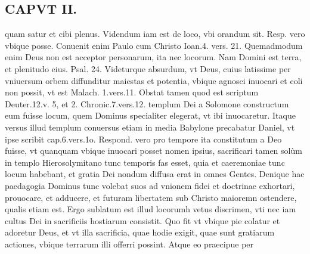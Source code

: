\documentclass{article}
\begin{document}
\begin{pages}
\section*{CAPVT II. }
\marginpar{[ p.67 ]}\pstart quam satur et cibi plenus.  \pend\pstart Videndum iam est de loco, vbi orandum sit. Resp. vero vbique posse. Conuenit enim Paulo cum Christo Ioan.4. vers. 21. Quemadmodum enim Deus non est acceptor personarum, ita nec locorum. Nam Domini est terra, et plenitudo eius. Psal. 24. Videturque absurdum, vt Deus, cuius latissime per vniuersum orbem diffunditur maiestas et potentia, vbique agnosci inuocari et coli non possit, vt est Malach. 1.vers.11.  \pend\pstart Obstat tamen quod est scriptum Deuter.12.v. 5, et 2. Chronic.7.vers.12. templum Dei a Solomone constructum eum fuisse locum, quem Dominus specialiter elegerat, vt ibi inuocaretur. Itaque versus illud templum conuersus etiam in media Babylone precabatur Daniel, vt ipse scribit cap.6.vers.1o. Respond. vero pro tempore ita constitutum a Deo fuisse, vt quanquam vbique inuocari posset nomen ipsius, sacrificari tamen solùm in templo Hierosolymitano tunc temporis fas esset, quia et caeremoniae tunc locum habebant, et gratia Dei nondum diffusa erat in omnes Gentes. Denique hac paedagogia Dominus tunc volebat suos ad vnionem fidei et doctrinae exhortari, prouocare, et adducere, et futuram libertatem sub Christo maioremn ostendere, qualis etiam est.  \pend\pstart Ergo sublatum est illud locorumh vetus discrimen, vti nec iam cultus Dei in sacrificiis hostiarum consistit. Quo fit vt vbique pie colatur et adoretur Deus, et vt illa sacrificia, quae hodie exigit, quae sunt gratiarum actiones, vbique terrarum illi offerri possint. Atque eo praecipue per\pend

\end{pages}
\end{document}
